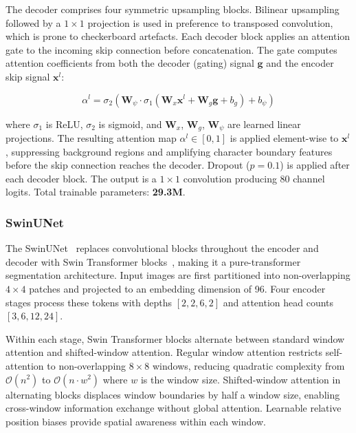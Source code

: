 \documentclass[a4paper,11pt]{article}
\begin{document}
The decoder comprises four symmetric upsampling blocks. Bilinear upsampling followed by
a $1 \times 1$ projection is used in preference to transposed convolution, which is prone
to checkerboard artefacts. Each decoder block applies an attention gate to the incoming
skip connection before concatenation. The gate computes attention coefficients from both
the decoder (gating) signal $\mathbf{g}$ and the encoder skip signal $\mathbf{x}^l$:

\begin{equation}
    \alpha^l = \sigma_2\!\left( \mathbf{W}_\psi \cdot \sigma_1\!\left(
    \mathbf{W}_x \mathbf{x}^l + \mathbf{W}_g \mathbf{g} + b_g \right)
    + b_\psi \right)
    \label{eq:attention_gate}
\end{equation}

where $\sigma_1$ is ReLU, $\sigma_2$ is sigmoid, and $\mathbf{W}_x$, $\mathbf{W}_g$,
$\mathbf{W}_\psi$ are learned linear projections. The resulting attention map
$\alpha^l \in [0,1]$ is applied element-wise to $\mathbf{x}^l$, suppressing background
regions and amplifying character boundary features before the skip connection reaches the
decoder. Dropout ($p = 0.1$) is applied after each decoder block. The output is a
$1 \times 1$ convolution producing 80 channel logits. Total trainable parameters:
\textbf{29.3M}.

\subsubsection{SwinUNet}

The SwinUNet~\cite{cao2022} replaces convolutional blocks throughout the encoder and
decoder with Swin Transformer blocks~\cite{liu2021}, making it a pure-transformer
segmentation architecture. Input images are first partitioned into non-overlapping
$4 \times 4$ patches and projected to an embedding dimension of 96. Four encoder stages
process these tokens with depths $[2, 2, 6, 2]$ and attention head counts
$[3, 6, 12, 24]$.

Within each stage, Swin Transformer blocks alternate between standard window attention
and shifted-window attention. Regular window attention restricts self-attention to
non-overlapping $8 \times 8$ windows, reducing quadratic complexity from
$\mathcal{O}(n^2)$ to $\mathcal{O}(n \cdot w^2)$ where $w$ is the window size.
Shifted-window attention in alternating blocks displaces window boundaries by half a
window size, enabling cross-window information exchange without global attention.
Learnable relative position biases provide spatial awareness within each window.
\end{document}
